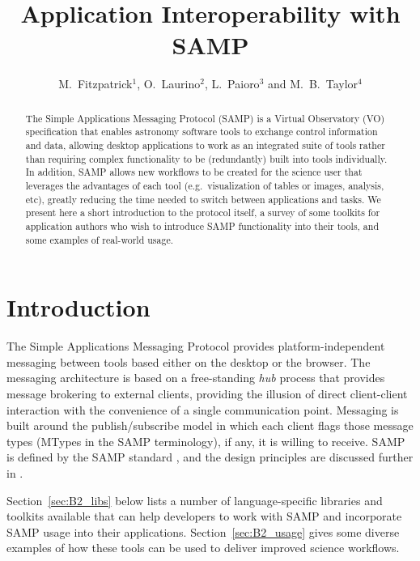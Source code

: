 \documentclass[11pt,twoside]{article}
\begin{document}
\title{Application Interoperability with SAMP}
\author{M.~Fitzpatrick$^1$, O.~Laurino$^2$, L.~Paioro$^3$ and M.~B.~Taylor$^4$}

\begin{abstract}
The Simple Applications Messaging Protocol (SAMP) is a Virtual Observatory
(VO) specification that enables astronomy software tools to exchange
control information and data, allowing desktop applications to work as
an integrated suite of tools rather than requiring complex functionality
to be (redundantly) built into tools individually. In addition, SAMP
allows new workflows to be created for the science user that leverages
the advantages of each tool (e.g.\ visualization of tables or images,
analysis, etc), greatly reducing the time needed to switch between
applications and tasks.
We present here a short introduction to the protocol itself,
a survey of some toolkits for application authors who wish to
introduce SAMP functionality into their tools,
and some examples of real-world usage.
\end{abstract}

\section{Introduction}

The Simple Applications Messaging Protocol provides
platform-independent messaging between tools based either on
the desktop or the browser.
The messaging architecture is based on a free-standing {\em hub\/} process
that provides message brokering to external clients,
providing the illusion of direct client-client interaction
with the convenience of a single communication point.
Messaging is built around the publish/subscribe model in which
each client flags those message types (MTypes in the SAMP terminology),
if any, it is willing to receive.
SAMP is defined by the SAMP standard \citep{samp1.3}, and
the design principles are discussed further in \citet{taylor2011}.

Section~\ref{sec:B2_libs} below lists a number of language-specific
libraries and toolkits available that can help developers to work
with SAMP and incorporate SAMP usage into their applications.
Section~\ref{sec:B2_usage} gives some diverse examples of
how these tools can be used to deliver improved science workflows.
\end{document}

